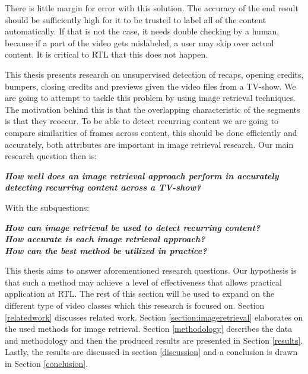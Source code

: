 \documentclass{article}
\begin{document}
There is little margin for error with this solution. The accuracy of the end result should be sufficiently high for it to be trusted to label all of the content automatically. If that is not the case, it needs double checking by a human, because if a part of the video gets mislabeled, a user may skip over actual content. It is critical to RTL that this does not happen.

This thesis presents research on unsupervised detection of recaps, opening credits, bumpers, closing credits and previews given the video files from a TV-show. We are going to attempt to tackle this problem by using image retrieval techniques. The motivation behind this is that the overlapping characteristic of the segments is that they reoccur. To be able to detect recurring content we are going to compare similarities of frames across content, this should be done efficiently and accurately, both attributes are important in image retrieval research. Our main research question then is:
\newline
\begin{adjustwidth}{0.3in}{0.3in}
\textit{\textbf{How well does an image retrieval approach perform in accurately detecting recurring content across a TV-show?\newline}}
\end{adjustwidth}
With the subquestions: \\
\begin{adjustwidth}{0.3in}{0.3in}
	\textit{\textbf{How can image retrieval be used to detect recurring content?\newline}}\\
	\textit{\textbf{How accurate is each image retrieval approach?\newline}}\\
	\textit{\textbf{How can the best method be utilized in practice?\newline}}
\end{adjustwidth}
This thesis aims to answer aforementioned research questions. Our hypothesis is that such a method may achieve a level of effectiveness that allows practical application at RTL. The rest of this section will be used to expand on the different type of video classes which this research is focused on. Section \ref{relatedwork} discusses related work. Section \ref{section:imageretrieval} elaborates on the used methods for image retrieval. Section \ref{methodology} describes the data and methodology and then the produced results are presented in Section \ref{results}. Lastly, the results are discussed in section \ref{discussion} and a conclusion is drawn in Section \ref{conclusion}.
\end{document}
